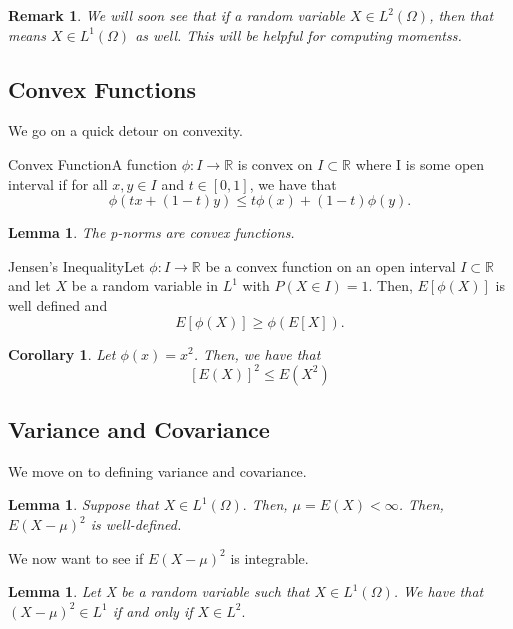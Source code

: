\documentclass[twoside]{article}
\newtheorem{lemma}[theorem]{Lemma}
\newtheorem{corollary}[theorem]{Corollary}
\newtheorem{remark}[theorem]{Remark}
\begin{document}
\begin{remark}We will soon see that if a random variable $X \in L^2(\Omega)$, then that means $X \in L^1(\Omega)$ as well. This will be helpful for computing momentss.
\end{remark}


\subsection{Convex Functions}
We go on a quick detour on convexity.
\begin{definition_exam}{Convex Function}{}A function $\phi: I \rightarrow \mathbb{R}$ is convex on $I \subset \mathbb{R}$ where I is some open interval if for all $x, y \in I$ and $t \in [0,1]$, we have that 
$$
\phi(tx + (1 - t)y) \leq t\phi(x) + (1 - t)\phi(y).
$$
\end{definition_exam}

\begin{lemma}The p-norms are convex functions.
\end{lemma}

\begin{theorem_exam}{Jensen's Inequality}{}Let $\phi: I \rightarrow \mathbb{R}$ be a convex function on an open interval $I \subset \mathbb{R}$ and let $X$ be a random variable in $L^1$ with $P(X \in I) = 1$. Then, $E[\phi(X)]$ is well defined and 
$$
E[\phi(X)] \geq \phi(E[X]).
$$
\end{theorem_exam}

\begin{corollary}Let $\phi(x) = x^2$. Then, we have that $$[E(X)]^2 \leq E(X^2)$$
\end{corollary}

\subsection{Variance and Covariance}

We move on to defining variance and covariance.
\begin{lemma}Suppose that $X \in L^1(\Omega).$ Then, $\mu = E(X) < \infty$. Then, $E(X - \mu)^2$ is well-defined.
\end{lemma}
We now want to see if $E(X - \mu)^2$ is integrable.

\begin{lemma}Let X be a random variable such that $X \in L^1(\Omega)$. We have that $(X - \mu)^2 \in L^1$ if and only if $X \in L^2.$
\end{lemma}
\end{document}
